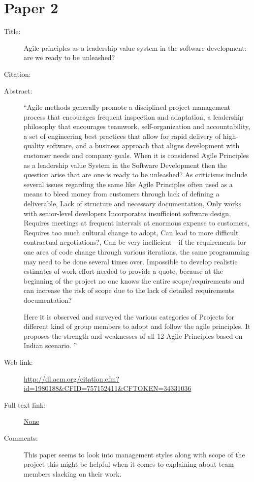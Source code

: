\documentclass{scrartcl}
\begin{document}
\section*{Paper 2}
\begin{description}
	\item[Title:] Agile principles as a leadership value system in the software development: are we ready to be unleashed?
	\item[Citation:] \cite{LeaderUnleashed}
	\item[Abstract:] ``Agile methods generally promote a disciplined project management process that encourages frequent inspection and adaptation, a leadership philosophy that encourages teamwork, self-organization and accountability, a set of engineering best practices that allow for rapid delivery of high-quality software, and a business approach that aligns development with customer needs and company goals. When it is considered Agile Principles as a leadership value System in the Software Development then the question arise that are one is ready to be unleashed? As criticisms include several issues regarding the same like Agile Principles often used as a means to bleed money from customers through lack of defining a deliverable, Lack of structure and necessary documentation, Only works with senior-level developers Incorporates insufficient software design, Requires meetings at frequent intervals at enormous expense to customers, Requires too much cultural change to adopt, Can lead to more difficult contractual negotiations?, Can be very inefficient---if the requirements for one area of code change through various iterations, the same programming may need to be done several times over. Impossible to develop realistic estimates of work effort needed to provide a quote, because at the beginning of the project no one knows the entire scope/requirements and can increase the risk of scope due to the lack of detailed requirements documentation?
	
	Here it is observed and surveyed the various categories of Projects for different kind of group members to adopt and follow the agile principles. It proposes the strength and weaknesses of all 12 Agile Principles based on Indian scenario.
	''
	\item[Web link:] \url{http://dl.acm.org/citation.cfm?id=1980188&CFID=757152411&CFTOKEN=34331036}
	\item[Full text link:] \url{None}
	\item[Comments:] This paper seems to look into management styles along with scope of the project this might be helpful when it comes to explaining about team members slacking on their work.
\end{description}
\end{document}
